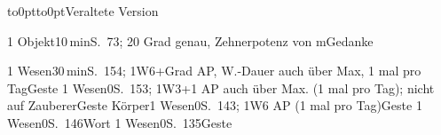 \documentclass{m5figur-mv}[2018/10/19]
\begin{document}
{{{
}%

\vbox to0pt{\vspace*{145mm}\hbox to0pt{\hspace*{2cm}Veraltete Version}}


%
  {1 Objekt}{10\,min}{S.~73; 20 Grad genau, Zehnerpotenz von m}{Gedanke}

%
  {1 Wesen}{30\,min}{S.~154; 1W6+Grad AP, W.-Dauer auch über Max,
  1 mal pro Tag}{Geste}
%
  {1 Wesen}{0}{S.~153; 1W3+1 AP auch über Max. (1 mal pro Tag);
  nicht auf Zauberer}{Geste}
%
  {Körper}{1 Wesen}{0}{S.~143; 1W6 AP (1 mal pro Tag)}{Geste}
%
  {1 Wesen}{0}{S.~146}{Wort}
%
  {1 Wesen}{0}{S.~135}{Geste}


\begin{minipage}{\Halbseitenbreite}%
\end{minipage}%
\begin{minipage}{\Halbseitenbreite}%
\end{minipage}%
\clearpage


}}
\end{document}
